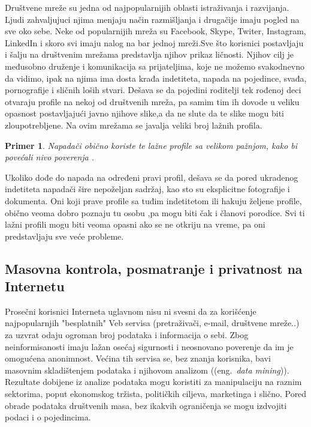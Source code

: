 \documentclass[a4paper]{article}
\newtheorem{primer}{Primer}[section]
\begin{document}
Društvene mreže su jedna od najpopularnijih oblasti istraživanja i razvijanja. Ljudi zahvaljujuci njima menjaju način razmišljanja i drugačije imaju pogled na sve oko sebe. Neke od popularnijih mreža su Facebook, Skype, Twiter, Instagram, LinkedIn i skoro svi imaju nalog na bar jednoj mreži.Sve što korisnici postavljaju i šalju na društvenim mrežama predstavlja njihov prikaz ličnosti. Njihov cilj je međusobno druženje i komunikacija sa prijateljima, koje ne možemo svakodnevno da vidimo, ipak na njima ima dosta krađa indetiteta, napada na pojedince, svađa, pornografije i sličnih loših stvari. Dešava se da pojedini roditelji tek rođenoj deci otvaraju profile na nekoj od društvenih mreža, pa samim tim ih dovode u veliku opasnost postavljajući javno njihove slike,a da ne slute da te slike mogu biti zloupotrebljene. Na ovim mrežama se javalja veliki broj lažnih profila.
\begin{primer}
Napadači obično koriste te lažne profile sa velikom pažnjom, kako bi povećali nivo poverenja \cite{fakePr} . 
\end{primer}
Ukoliko dođe do napada na određeni pravi profil, dešava se da pored ukradenog indetiteta  napadači šire nepoželjan sadržaj, kao sto su eksplicitne fotografije i dokumenta. Oni koji prave profile sa tuđim indetitetom ili hakuju željene profile, obično veoma dobro poznaju tu osobu ,pa  mogu biti čak i članovi porodice. Svi ti lažni profili mogu biti veoma opasni ako se ne otkriju na vreme, pa oni predstavljaju sve veće probleme.

\subsection{Masovna kontrola, posmatranje i privatnost na Internetu}
\label{subsec:podnaslovIP4}

\indent\indent Prosečni korisnici Interneta uglavnom nisu ni svesni da za korišćenje najpopularnjih "besplatnih" Veb servisa (pretraživači, e-mail, društvene mreže..) za uzvrat odaju ogroman broj podataka i informacija o sebi. Zbog neinformisanosti imaju lažan osećaj sigurnosti i neosnovano poverenje da im je omogućena anonimnost. Većina tih servisa se, bez znanja korisnika, bavi masovnim skladištenjem podataka i njihovom analizom ((eng.~{\em data mining})). Rezultate dobijene iz analize podataka mogu koristiti za manipulaciju na raznim sektorima, poput ekonomskog tržista, političkih ciljeva, marketinga i slično. Pored obrade podataka društvenih masa, bez ikakvih ograničenja se mogu izdvojiti podaci i o pojedincima.
		
\end{document}
